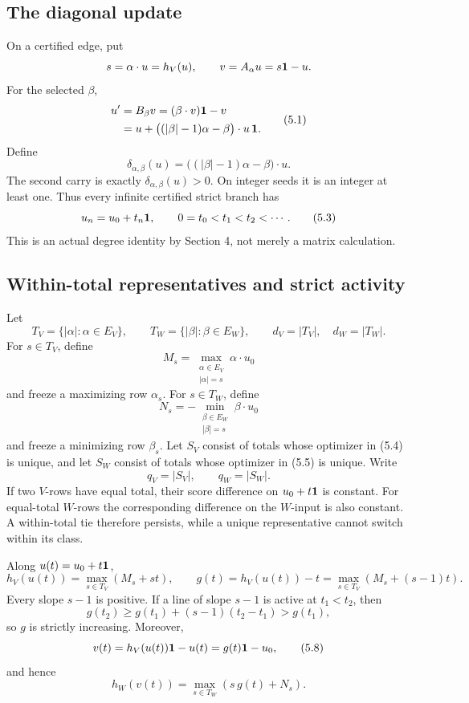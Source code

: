 \documentclass[11pt]{article}
\theoremstyle{definition}
\theoremstyle{remark}
\begin{document}
\subsection{The diagonal update}

On a certified edge, put
\[
 s=\alpha\cdot u=h_V(u),\qquad
 v=A_\alpha u=s\mathbf{1}-u.
\]
For the selected \(\beta\),
\[
\begin{aligned}
u'&=B_\beta v
   =(\beta\cdot v)\mathbf{1}-v\\
  &=u+\bigl((|\beta|-1)\alpha-\beta\bigr)\cdot u\,\mathbf{1}.
\end{aligned}
\tag{5.1}
\]
Define
\[
 \delta_{\alpha,\beta}(u)
 =\bigl((|\beta|-1)\alpha-\beta\bigr)\cdot u.
\tag{5.2}
\]
The second carry is exactly \(\delta_{\alpha,\beta}(u)>0\).  On integer
seeds it is an integer at least one.  Thus every infinite certified strict
branch has
\[
 u_n=u_0+t_n\mathbf{1},\qquad 0=t_0<t_1<t_2<\cdots .
\tag{5.3}
\]
This is an actual degree identity by Section 4, not merely a matrix
calculation.

\subsection{Within-total representatives and strict activity}

Let
\[
 T_V=\{|\alpha|:\alpha\in E_V\},\qquad
 T_W=\{|\beta|:\beta\in E_W\},
 \qquad d_V=|T_V|,\quad d_W=|T_W|.
\]
For \(s\in T_V\), define
\[
 M_s=\max_{\substack{\alpha\in E_V\\|\alpha|=s}}
       \alpha\cdot u_0
\tag{5.4}
\]
and freeze a maximizing row \(\alpha_s\).  For \(s\in T_W\), define
\[
 N_s=-\min_{\substack{\beta\in E_W\\|\beta|=s}}
       \beta\cdot u_0
\tag{5.5}
\]
and freeze a minimizing row \(\beta_s\).  Let \(S_V\) consist of totals
whose optimizer in (5.4) is unique, and let \(S_W\) consist of totals whose
optimizer in (5.5) is unique.  Write
\[
 q_V=|S_V|,\qquad q_W=|S_W|.
\tag{5.6}
\]
If two \(V\)-rows have equal total, their score difference on
\(u_0+t\mathbf{1}\) is constant.  For equal-total \(W\)-rows the corresponding
difference on the \(W\)-input is also constant.  A within-total tie
therefore persists, while a unique representative cannot switch within its
class.

Along \(u(t)=u_0+t\mathbf{1}\),
\[
 h_V(u(t))=\max_{s\in T_V}(M_s+st),
\qquad
 g(t)=h_V(u(t))-t
     =\max_{s\in T_V}(M_s+(s-1)t).
\tag{5.7}
\]
Every slope \(s-1\) is positive.  If a line of slope \(s-1\) is active at
\(t_1<t_2\), then
\[
 g(t_2)\geq g(t_1)+(s-1)(t_2-t_1)>g(t_1),
\]
so \(g\) is strictly increasing.  Moreover,
\[
 v(t)=h_V(u(t))\mathbf{1}-u(t)=g(t)\mathbf{1}-u_0,
\tag{5.8}
\]
and hence
\[
 h_W(v(t))=\max_{s\in T_W}(s\,g(t)+N_s).
\tag{5.9}
\]
\end{document}
